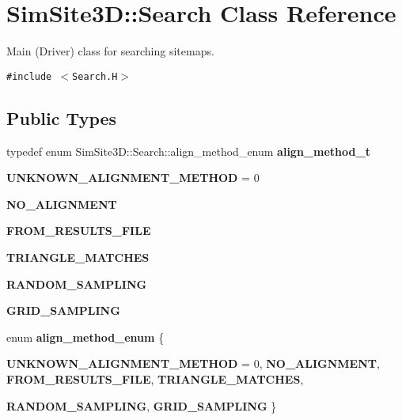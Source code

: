 \section{SimSite3D::Search Class Reference}
\label{classSimSite3D_1_1Search}
Main (Driver) class for searching sitemaps.  


{\tt \#include $<$Search.H$>$}

\subsection*{Public Types}
\begin{CompactItemize}
\item 
typedef enum SimSite3D::Search::align\_\-method\_\-enum \textbf{align\_\-method\_\-t}\label{classSimSite3D_1_1Search_a9a44b9d89721dd413afb8490f4183c3}

\item 
\textbf{UNKNOWN\_\-ALIGNMENT\_\-METHOD} = 0\label{classSimSite3D_1_1Search_809c94eeeb25e147aa08d2f815a789863082530b329b01a266cf0c1141717bf3}

\item 
\textbf{NO\_\-ALIGNMENT}\label{classSimSite3D_1_1Search_809c94eeeb25e147aa08d2f815a789866c54f67a19009c78bf649262c0340adb}

\item 
\textbf{FROM\_\-RESULTS\_\-FILE}\label{classSimSite3D_1_1Search_809c94eeeb25e147aa08d2f815a7898696fb54c9b28bf785753ffdf6dde83b51}

\item 
\textbf{TRIANGLE\_\-MATCHES}\label{classSimSite3D_1_1Search_809c94eeeb25e147aa08d2f815a7898638899be1fef1a8ff304fc9ce51878356}

\item 
\textbf{RANDOM\_\-SAMPLING}\label{classSimSite3D_1_1Search_809c94eeeb25e147aa08d2f815a789867516ae95f045b741fd84de2adc079724}

\item 
\textbf{GRID\_\-SAMPLING}\label{classSimSite3D_1_1Search_809c94eeeb25e147aa08d2f815a789865c39ba09fea0735bc5b06204c4251b7d}

\item 
enum \textbf{align\_\-method\_\-enum} \{ \par
\textbf{UNKNOWN\_\-ALIGNMENT\_\-METHOD} =  0, 
\textbf{NO\_\-ALIGNMENT}, 
\textbf{FROM\_\-RESULTS\_\-FILE}, 
\textbf{TRIANGLE\_\-MATCHES}, 
\par
\textbf{RANDOM\_\-SAMPLING}, 
\textbf{GRID\_\-SAMPLING}
 \}
\end{CompactItemize}
